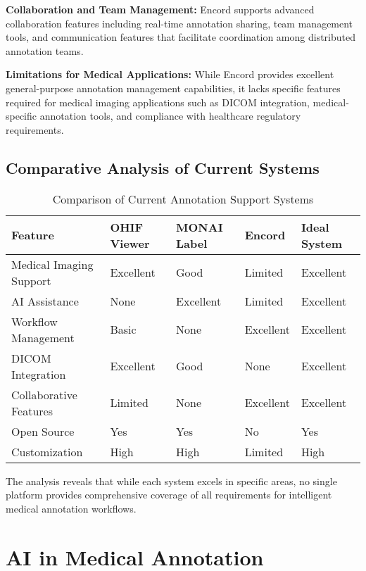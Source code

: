\textbf{Collaboration and Team Management:} Encord supports advanced collaboration features including real-time annotation sharing, team management tools, and communication features that facilitate coordination among distributed annotation teams.

\textbf{Limitations for Medical Applications:} While Encord provides excellent general-purpose annotation management capabilities, it lacks specific features required for medical imaging applications such as DICOM integration, medical-specific annotation tools, and compliance with healthcare regulatory requirements.

\subsection{Comparative Analysis of Current Systems}

\begin{table}[htbp]
\centering
\caption{Comparison of Current Annotation Support Systems}
\label{tab:system-comparison}
\begin{tabular}{|p{2.5cm}|p{3cm}|p{3cm}|p{3cm}|p{3cm}|}
\hline
\textbf{Feature} & \textbf{OHIF Viewer} & \textbf{MONAI Label} & \textbf{Encord} & \textbf{Ideal System} \\
\hline
Medical Imaging Support & Excellent & Good & Limited & Excellent \\
\hline
AI Assistance & None & Excellent & Limited & Excellent \\
\hline
Workflow Management & Basic & None & Excellent & Excellent \\
\hline
DICOM Integration & Excellent & Good & None & Excellent \\
\hline
Collaborative Features & Limited & None & Excellent & Excellent \\
\hline
Open Source & Yes & Yes & No & Yes \\
\hline
Customization & High & High & Limited & High \\
\hline
\end{tabular}
\end{table}

The analysis reveals that while each system excels in specific areas, no single platform provides comprehensive coverage of all requirements for intelligent medical annotation workflows.

\section{AI in Medical Annotation}

